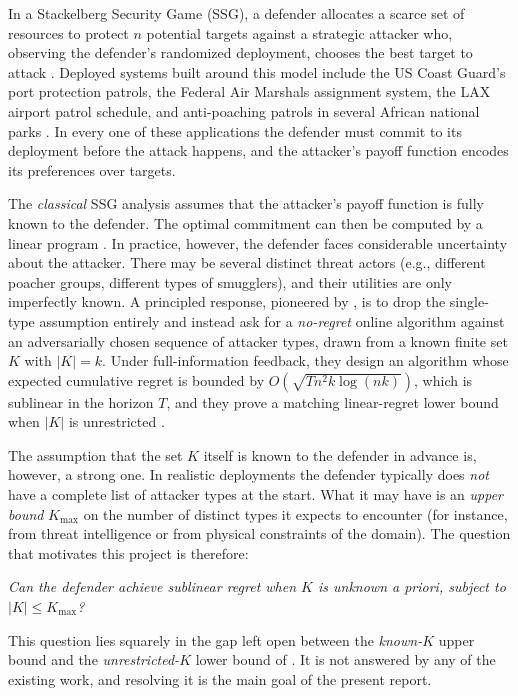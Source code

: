 \documentclass[letterpaper,9pt,twocolumn]{extarticle}
\newcommand{\Kmax}{K_{\max}}
\theoremstyle{plain}
\theoremstyle{definition}
\theoremstyle{remark}
\begin{document}
In a Stackelberg Security Game (SSG), a defender allocates a scarce set of
resources to protect $n$ potential targets against a strategic attacker
who, observing the defender's randomized deployment, chooses the best
target to attack \citep{tambe2012}. Deployed systems built around this model
include the US Coast Guard's port protection patrols, the Federal Air
Marshals assignment system, the LAX airport patrol schedule, and
anti-poaching patrols in several African national parks
\citep{tambe2012,yang2014}. In every one of these applications the
defender must commit to its deployment before the attack happens, and the
attacker's payoff function encodes its preferences over targets.

The \emph{classical} SSG analysis assumes that the attacker's payoff
function is fully known to the defender. The optimal commitment can then
be computed by a linear program \citep[e.g.,][]{pita2010}. In practice,
however, the defender faces considerable uncertainty about the attacker.
There may be several distinct threat actors (e.g., different poacher
groups, different types of smugglers), and their utilities are only
imperfectly known. A principled response, pioneered by \citet{balcan2015},
is to drop the single-type assumption entirely and instead ask for a
\emph{no-regret} online algorithm against an adversarially chosen sequence
of attacker types, drawn from a known finite set $K$ with $|K|=k$. Under
full-information feedback, they design an algorithm whose expected
cumulative regret is bounded by $O(\sqrt{Tn^2 k\log(nk)})$, which is
sublinear in the horizon $T$, and they prove a matching linear-regret lower
bound when $|K|$ is unrestricted \citep[Theorem~7.1]{balcan2015}.

The assumption that the set $K$ itself is known to the defender in advance
is, however, a strong one. In realistic deployments the defender typically
does \emph{not} have a complete list of attacker types at the start. What
it may have is an \emph{upper bound} $\Kmax$ on the number of distinct
types it expects to encounter (for instance, from threat intelligence or
from physical constraints of the domain). The question that motivates this
project is therefore:
\begin{center}
\emph{Can the defender achieve sublinear regret when $K$ is unknown a
priori, subject to $|K|\le \Kmax$?}
\end{center}
This question lies squarely in the gap left open between the
\emph{known-$K$} upper bound and the \emph{unrestricted-$K$} lower bound of
\citet{balcan2015}. It is not answered by any of the existing work, and
resolving it is the main goal of the present report.
\end{document}
